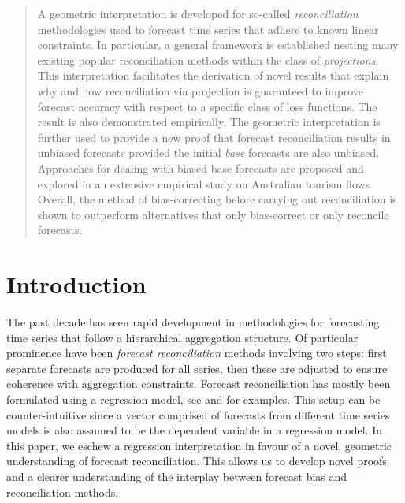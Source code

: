 \documentclass[12pt]{article}
\theoremstyle{definition}
\def\spacingset#1{\renewcommand{\baselinestretch}%
    {#1}\small\normalsize} \spacingset{1}
\begin{document}
\begin{abstract}
\spacingset{1.45}
  A geometric interpretation is developed for so-called \emph{reconciliation} methodologies used to forecast time series that adhere to known linear constraints. In particular, a general framework is established nesting many existing popular reconciliation methods within the class of \emph{projections}. This interpretation facilitates the derivation of novel results that explain why and how reconciliation via projection is guaranteed to improve forecast accuracy with respect to a specific class of loss functions. The result is also demonstrated empirically. The geometric interpretation is further used to provide a new proof that forecast reconciliation results in unbiased forecasts provided the initial \emph{base} forecasts are also unbiased. Approaches for dealing with biased base forecasts are proposed and explored in an extensive empirical study on Australian tourism flows. Overall, the method of bias-correcting before carrying out reconciliation is shown to outperform alternatives that only bias-correct or only reconcile forecasts.

\end{abstract}


\newpage
\spacingset{1.45} %

\section{Introduction}\label{sec:intro}

The past decade has seen rapid development in methodologies for forecasting time series that follow a hierarchical aggregation structure. Of particular prominence have been \emph{forecast reconciliation} methods involving two steps: first separate forecasts are produced for all series, then these are adjusted to ensure coherence with aggregation constraints. Forecast reconciliation has mostly been formulated using a regression model, see \citet{Hyndman2011} and \citet{WicEtAl2019} for examples. This setup can be counter-intuitive since a vector comprised of forecasts from different time series models is also assumed to be the dependent variable in a regression model. In this paper, we eschew a regression interpretation in favour of a novel, geometric understanding of forecast reconciliation. This allows us to develop novel proofs and a clearer understanding of the interplay between forecast bias and reconciliation methods.
\end{document}

